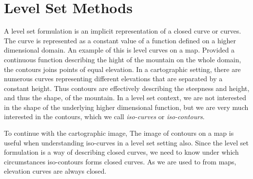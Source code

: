 \chapter{Level Set Methods}
\newcommand{\uxt}{$u(\mathbf{x}, t)$ }

A level set formulation is an implicit representation of a closed curve or curves. 
The curve is represented as a constant value of a function defined on a higher
dimensional domain. An example of this is level curves on a map. Provided 
a continuous function describing the hight of the mountain on the whole
domain, the contours joins points of equal elevation. In a cartographic
setting, there are numerous curves representing different elevations that 
are separated by a constant height. Thus contours are effectively describing
the steepness and height, and thus the shape, of the mountain. In a level set
context, we are not interested in the shape of the underlying higher dimensional
function, but we are very much interested in the contours, which we call 
\textit{iso-curves} or \textit{iso-contours}.

To continue with the cartographic image, 
The image of contours on a map is useful when understanding iso-curves in a
level set setting also. Since the level set formulation is a way of describing
closed curves, we need to know under which circumstances iso-contours forms 
closed curves. As we are used to from maps, elevation curves are always closed.


